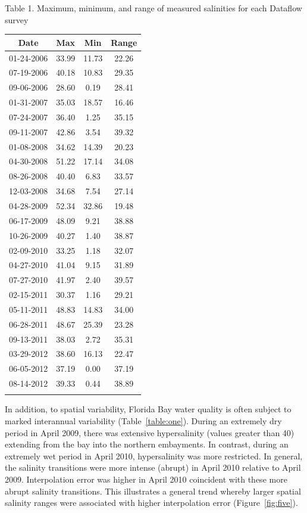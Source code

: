 \documentclass[shortnames,nofooter,noheadings]{jss}
\begin{document}
\vspace{20pt}
Table 1. Maximum, minimum, and range of measured salinities for each Dataflow survey
\begin{center}
\begin{tabular}{c c c c}
\hline
Date & Max & Min & Range \\
\hline
01-24-2006 & 33.99 & 11.73 & 22.26 \\
07-19-2006 & 40.18 & 10.83 & 29.35 \\
09-06-2006 & 28.60 & 0.19 & 28.41 \\
01-31-2007 & 35.03 & 18.57 & 16.46 \\
07-24-2007 & 36.40 & 1.25 & 35.15 \\
09-11-2007 & 42.86 & 3.54 & 39.32 \\
01-08-2008 & 34.62 & 14.39 & 20.23 \\
04-30-2008 & 51.22 & 17.14 & 34.08 \\
08-26-2008 & 40.40 & 6.83 & 33.57 \\
12-03-2008 & 34.68 & 7.54 & 27.14 \\
04-28-2009 & 52.34 & 32.86 & 19.48 \\
06-17-2009 & 48.09 & 9.21 & 38.88 \\ 
10-26-2009 & 40.27 & 1.40 & 38.87 \\
02-09-2010 & 33.25 & 1.18 & 32.07 \\
04-27-2010 & 41.04 & 9.15 & 31.89 \\
07-27-2010 & 41.97 & 2.40 & 39.57 \\
02-15-2011 & 30.37 & 1.16 & 29.21 \\
05-11-2011 & 48.83 & 14.83 & 34.00 \\
06-28-2011 & 48.67 & 25.39 & 23.28 \\
09-13-2011 & 38.03 & 2.72 & 35.31 \\
03-29-2012 & 38.60 & 16.13 & 22.47 \\
06-05-2012 & 37.19 & 0.00 & 37.19 \\
08-14-2012 & 39.33 & 0.44 & 38.89 \\
\hline
\label{table:one}
\end{tabular}
\end{center}
\vspace{20pt}

\noindent In addition, to spatial variability, Florida Bay water quality is often subject to marked interannual variability (Table~\ref{table:one}). During an extremely dry period in April 2009, there was extensive hypersalinity (values greater than 40) extending from the bay into the northern embayments. In contrast, during an extremely wet period in April 2010, hypersalinity was more restricted. In general, the salinity transitions were more intense (abrupt) in April 2010 relative to April 2009. Interpolation error was higher in April 2010 coincident with these more abrupt salinity transitions. This illustrates a general trend whereby larger spatial salinity ranges were associated with higher interpolation error (Figure~\ref{fig:five}).
  
\end{document}
